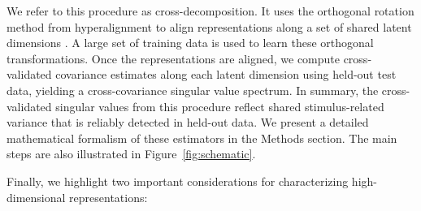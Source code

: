 \documentclass[10pt]{article}
\begin{document}
We refer to this procedure as cross-decomposition. It uses the orthogonal rotation method from hyperalignment to align representations along a set of shared latent dimensions \autocite{Haxby2011}. A large set of training data is used to learn these orthogonal transformations. Once the representations are aligned, we compute cross-validated covariance estimates along each latent dimension using held-out test data, yielding a cross-covariance singular value spectrum. In summary, the cross-validated singular values from this procedure reflect shared stimulus-related variance that is reliably detected in held-out data. We present a detailed mathematical formalism of these estimators in the Methods section. The main steps are also illustrated in Figure~\ref{fig:schematic}.

Finally, we highlight two important considerations for characterizing high-dimensional representations:
\end{document}
